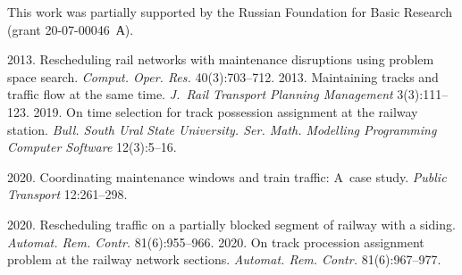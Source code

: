 


\vspace*{-18pt}

\Ack

\vspace*{-4pt}


\noindent
This work was partially supported by the Russian Foundation for Basic Research (grant  
20-07-00046~А).


\vspace*{12pt}

  \begin{multicols}{2}

\renewcommand{\bibname}{\protect\rmfamily References}

{\small\frenchspacing
 {%
 \begin{thebibliography}{99}
 
 
 2013. Rescheduling rail networks with 
maintenance disruptions using problem space search. \textit{Comput. Oper. Res.} 40(3):703--712.
 2013. Maintaining tracks and traffic flow at the 
same time. \textit{J.~Rail Transport Planning Management} 3(3):111--123.
 2019. On time selection for track possession assignment 
at the railway station. \textit{Bull. South Ural State University. Ser. Math. Modelling Programming 
Computer Software} 12(3):5--16.

 2020. Coordinating maintenance windows and train traffic: A~case study. 
\textit{Public Transport} 12:261--298.

 2020. Rescheduling traffic on a partially 
blocked segment of railway with a siding. \textit{Automat. Rem. Contr.} 81(6):955--966.
 2020. On track 
procession assignment problem at the railway network sections. \textit{Automat. Rem. Contr.} 
81(6):967--977.


\end{thebibliography}}}
\end{multicols}
